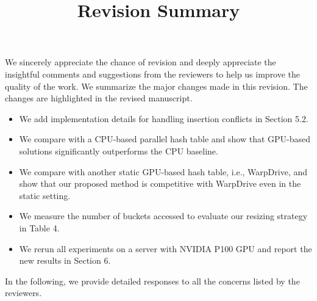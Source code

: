 \documentclass[11pt]{article}
\begin{document}
\title{Revision Summary}
\date{}
\maketitle


\noindent We sincerely appreciate the chance of revision and deeply appreciate the insightful comments and suggestions from the reviewers to help us improve the quality of the work. We summarize the major changes made in this revision. The changes are highlighted in the revised manuscript.  
\begin{itemize}
	\item We add implementation details for handling insertion conflicts in Section 5.2.
	\item We compare with a CPU-based parallel hash table and show that GPU-based solutions significantly outperforms the CPU baseline. 
	\item We compare with another static GPU-based hash table, i.e., WarpDrive, and show that our proposed method is competitive with WarpDrive even in the static setting. 
	\item We measure the number of buckets accessed to evaluate our resizing strategy in Table 4.
	\item We rerun all experiments on a server with NVIDIA P100 GPU and report the new results in Section 6.
\end{itemize}
%
In the following, we provide detailed responses to all the concerns listed by the reviewers.







%


\end{document}
